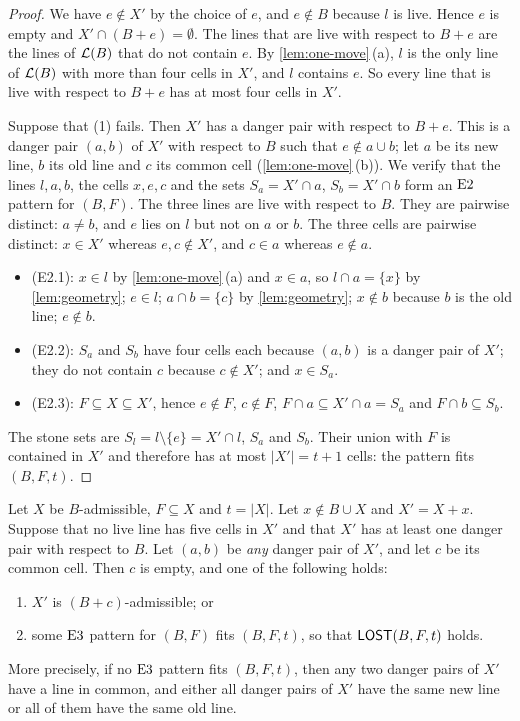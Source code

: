 \begin{proof}
We have $e\notin X'$ by the choice of $e$, and $e\notin B$ because $l$ is live. Hence $e$ is empty and
$X'\cap(B+e)=\emptyset$. The lines that are live with respect to $B+e$ are the lines of $\mathcal{L}(B)$ that do
not contain $e$. By \cref{lem:one-move}\,(a), $l$ is the only line of $\mathcal{L}(B)$ with more than four
cells in $X'$, and $l$ contains $e$. So every line that is live with respect to $B+e$ has at most four
cells in $X'$.

Suppose that (1) fails. Then $X'$ has a danger pair with respect to $B+e$. This is a danger pair $(a,b)$ of
$X'$ with respect to $B$ such that $e\notin a\cup b$; let $a$ be its new line, $b$ its old line and $c$ its
common cell (\cref{lem:one-move}\,(b)). We verify that the lines $l,a,b$, the cells $x,e,c$ and the sets
$S_a=X'\cap a$, $S_b=X'\cap b$ form an $\mathrm{E2}$ pattern for $(B,F)$. The three lines are live with respect to
$B$. They are pairwise distinct: $a\ne b$, and $e$ lies on $l$ but not on $a$ or $b$. The three cells are
pairwise distinct: $x\in X'$ whereas $e,c\notin X'$, and $c\in a$ whereas $e\notin a$.
\begin{itemize}[leftmargin=2.2em]
\item (E2.1): $x\in l$ by \cref{lem:one-move}\,(a) and $x\in a$, so $l\cap a=\{x\}$ by
  \cref{lem:geometry}; $e\in l$; $a\cap b=\{c\}$ by \cref{lem:geometry}; $x\notin b$ because $b$ is
  the old line; $e\notin b$.
\item (E2.2): $S_a$ and $S_b$ have four cells each because $(a,b)$ is a danger pair of $X'$; they do not
  contain $c$ because $c\notin X'$; and $x\in S_a$.
\item (E2.3): $F\subseteq X\subseteq X'$, hence $e\notin F$, $c\notin F$, $F\cap a\subseteq X'\cap a=S_a$
  and $F\cap b\subseteq S_b$.
\end{itemize}
The stone sets are $S_l=l\setminus\{e\}=X'\cap l$, $S_a$ and $S_b$. Their union with $F$ is contained
in $X'$ and therefore has at most $|X'|=t+1$ cells: the pattern fits $(B,F,t)$.
\end{proof}

\begin{lemma}[Danger]\label{lem:danger}
Let $X$ be $B$-admissible, $F\subseteq X$ and $t=|X|$. Let $x\notin B\cup X$ and $X'=X+x$. Suppose that no live
line has five cells in $X'$ and that $X'$ has at least one danger pair with respect to $B$. Let $(a,b)$ be
\emph{any} danger pair of $X'$, and let $c$ be its common cell. Then $c$ is empty, and one of the following
holds:
\begin{enumerate}[label=\textup{(\arabic*)},leftmargin=2.4em]
\item $X'$ is $(B+c)$-admissible; or
\item some $\mathrm{E3}$ pattern for $(B,F)$ fits $(B,F,t)$, so that $\mathsf{LOST}(B,F,t)$ holds.
\end{enumerate}
More precisely, if no $\mathrm{E3}$ pattern fits $(B,F,t)$, then any two danger pairs of $X'$ have a line in
common, and either all danger pairs of $X'$ have the same new line or all of them have the same old line.
\end{lemma}

